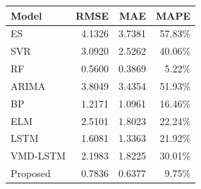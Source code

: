 {\tiny\setlength{\tabcolsep}{2pt}\begin{tabular}{lrrr} \toprule
Model & RMSE & MAE & MAPE \\ \midrule
ES & 4.1326 & 3.7381 & 57.83\% \\ 
SVR & 3.0920 & 2.5262 & 40.06\% \\ 
RF & 0.5600 & 0.3869 & 5.22\% \\ 
ARIMA & 3.8049 & 3.4354 & 51.93\% \\ 
BP & 1.2171 & 1.0961 & 16.46\% \\ 
ELM & 2.5101 & 1.8023 & 22.24\% \\ 
LSTM & 1.6081 & 1.3363 & 21.92\% \\ 
VMD-LSTM & 2.1983 & 1.8225 & 30.01\% \\ 
Proposed & 0.7836 & 0.6377 & 9.75\% \\ 
\bottomrule \end{tabular}}